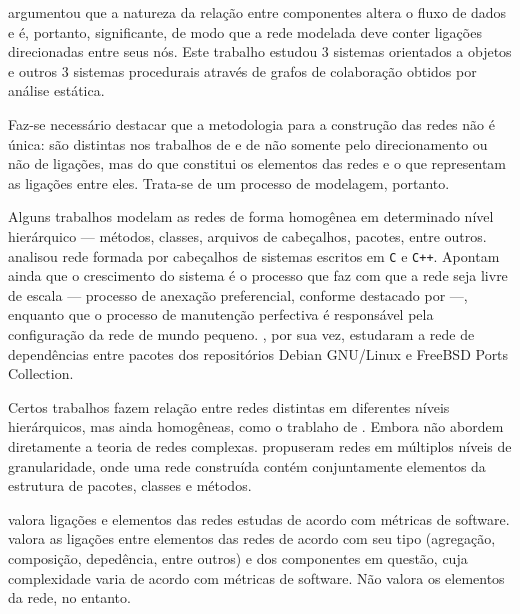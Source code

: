  argumentou que a natureza da relação entre
componentes altera o fluxo de dados e é, portanto, significante, de modo que a
rede modelada deve conter ligações direcionadas entre seus nós. Este trabalho
estudou 3 sistemas orientados a objetos e outros 3 sistemas procedurais através
de grafos de colaboração obtidos por análise estática.

Faz-se necessário destacar que a metodologia para a construção das redes não é 
única: são distintas nos trabalhos de  e de 
 não somente pelo direcionamento ou não de
ligações, mas do que constitui os elementos das redes e o que representam as
ligações entre eles. Trata-se de um processo de modelagem, portanto.

Alguns trabalhos modelam as redes de forma homogênea em determinado nível
hierárquico --- métodos, classes, arquivos de cabeçalhos, pacotes, entre outros.
 analisou rede formada por cabeçalhos de
sistemas escritos em \texttt{C} e \texttt{C++}.
Apontam ainda que o crescimento do sistema é o processo que faz com que a rede
seja livre de escala --- processo de anexação preferencial, conforme destacado
por  ---, enquanto que o processo de
manutenção perfectiva é responsável pela configuração da rede de mundo pequeno.
, por sua vez, estudaram a rede de
dependências entre pacotes dos repositórios Debian GNU/Linux e FreeBSD Ports
Collection.

Certos trabalhos fazem relação entre redes distintas em diferentes
níveis hierárquicos, mas ainda homogêneas, como o trablaho de
. Embora não abordem diretamente a teoria de
redes complexas.
 propuseram redes em múltiplos níveis de granularidade,
onde uma rede construída contém conjuntamente elementos da estrutura de pacotes,
classes e métodos.

 valora ligações e elementos das redes estudas de
acordo com métricas de software.  valora as
ligações entre elementos das redes de acordo com seu tipo (agregação,
composição, depedência, entre outros) e dos componentes em questão, cuja
complexidade varia de acordo com métricas de software. Não valora os elementos
da rede, no entanto.
